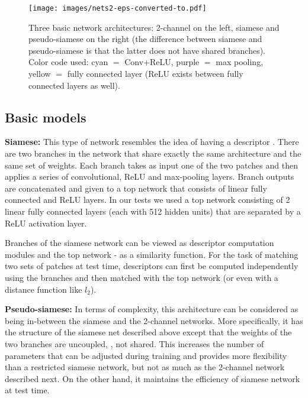 \documentclass[10pt,twocolumn,letterpaper]{article}
\newcommand*{\USEIMAGES}{}
\begin{document}
\ifdefined\USEIMAGES
\begin{figure}
  \begin{center}
  \texttt{[image: images/nets2-eps-converted-to.pdf]}
  \end{center}
  \vspace{-5pt}
  \caption{Three basic network architectures: 2-channel on the left, siamese and pseudo-siamese on the right (the difference between siamese and pseudo-siamese is that the latter does not have shared branches). Color code used: cyan $=$ Conv+ReLU, purple $=$ max pooling, yellow $=$ fully connected layer (ReLU  exists between fully connected layers as well).}
  \label{fig:basic_models}
  \vspace{-5pt}
\end{figure}
\fi

\subsection{Basic models}\label{sec:basic_models}

\textbf{Siamese:} This type of network resembles the idea of having a descriptor \cite{siamese, chopra-05}. There are two branches in the network that share exactly the same architecture and the same set of weights. Each branch takes as input one of the two patches and then applies a series of convolutional, ReLU and max-pooling layers. 
Branch outputs are concatenated and given to 
a top network that consists of linear fully connected and ReLU layers. In our tests we used a top network consisting of 2 linear fully connected layers (each with 512 hidden units) that are separated by a ReLU activation layer.

Branches of the siamese network can be viewed as descriptor computation modules and 
the top network - as a similarity function. For the task of matching two sets of patches at test time, descriptors can first be computed independently using the branches and then matched with the top 
network (or even with a distance function like $l_2$).

\textbf{Pseudo-siamese:} In terms of complexity, this architecture can be considered as being in-between the siamese and  the 2-channel  networks.
More specifically, it has the structure of the siamese net described above except that the weights of the two branches are
 uncoupled, \ie, not shared. This increases the number of parameters that can be adjusted during training and provides more flexibility than
a restricted siamese network, but not as much as the 2-channel network described next. On the other hand, it maintains the efficiency of siamese network at test time.
\end{document}
